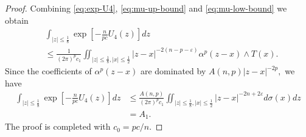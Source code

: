 \documentclass{amsart}
\newcommand{\veps}{\varepsilon}
\newcommand{\al}{\alpha}
\newcommand{\sig}{\sigma}
\theoremstyle{definition}
\numberwithin{thm}{section}
\numberwithin{equation}{section}
\renewcommand{\[}{\begin{equation}}
\renewcommand{\]}{\end{equation}}
\newcommand{\wed}{\wedge}
\begin{document}
\begin{proof}
Combining \eqref{eq:exp-U4}, \eqref{eq:mu-up-bound} and \eqref{eq:mu-low-bound}  we obtain
$$\begin{aligned}
&	\int_{|z| \leq \frac{1}{8}} \exp \left[ - \frac{n}{pc} U_4(z) \right] dz \\
&\leq	 \frac{1}{(2\pi)^p c_1} \iint_{|z| \leq \frac{1}{8}, |x| \leq \frac{1}{2}} |z-x|^{- 2(n-p-\veps)} \al^p(z-x) \wed T(x).
\end{aligned}
$$
Since the coefficients of $\al^p(z-x)$ are dominated by
$
	A(n,p) |z-x|^{-2p},
$
we have 
$$\begin{aligned}
	\int_{|z| \leq \frac{1}{8}} \exp \left[ - \frac{n}{pc} U_4(z) \right] dz 
&\leq	 \frac{A(n,p)}{(2\pi)^p c_1} \iint_{|z| \leq \frac{1}{8}, |x| \leq \frac{1}{2}} |z-x|^{- 2n + 2\veps} d\sig(x) dz \\
&= A_1.
\end{aligned}
$$
The proof is completed with $c_0 =  pc/n$.
\end{proof}
\end{document}

